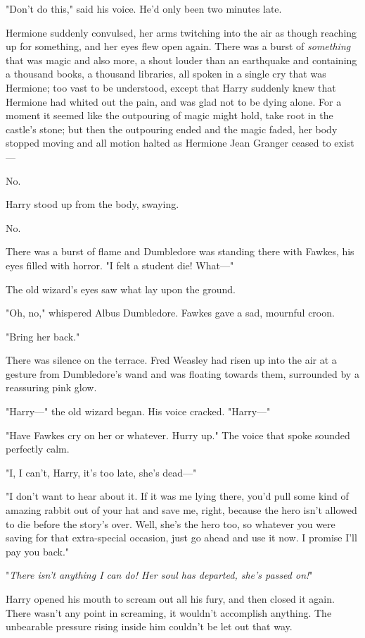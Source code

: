 "Don't do this," said his voice. He'd only been two minutes late.

Hermione suddenly convulsed, her arms twitching into the air as though reaching
up for something, and her eyes flew open again. There was a burst of
\emph{something} that was magic and also more, a shout louder than an
earthquake and containing a thousand books, a thousand libraries, all spoken in
a single cry that was Hermione; too vast to be understood, except that Harry
suddenly knew that Hermione had whited out the pain, and was glad not to be
dying alone. For a moment it seemed like the outpouring of magic might hold,
take root in the castle's stone; but then the outpouring ended and the magic
faded, her body stopped moving and all motion halted as Hermione Jean Granger
ceased to exist---

No.

Harry stood up from the body, swaying.

No.

There was a burst of flame and Dumbledore was standing there with Fawkes, his
eyes filled with horror. "I felt a student die! What\mbox{---}"

The old wizard's eyes saw what lay upon the ground.

"Oh, no," whispered Albus Dumbledore. Fawkes gave a sad, mournful croon.

"Bring her back."

There was silence on the terrace. Fred Weasley had risen up into the air at a
gesture from Dumbledore's wand and was floating towards them, surrounded by a
reassuring pink glow.

"Harry\mbox{---}" the old wizard began. His voice cracked. "Harry\mbox{---}"

"Have Fawkes cry on her or whatever. Hurry up." The voice that spoke sounded
perfectly calm.

"I, I can't, Harry, it's too late, she's dead\mbox{---}"

"I don't want to hear about it. If it was me lying there, you'd pull some kind
of amazing rabbit out of your hat and save me, right, because the hero isn't
allowed to die before the story's over. Well, she's the hero too, so whatever
you were saving for that extra-special occasion, just go ahead and use it now.
I promise I'll pay you back."

"\emph{There isn't anything I can do! Her soul has departed, she's passed on!}"

Harry opened his mouth to scream out all his fury, and then closed it again.
There wasn't any point in screaming, it wouldn't accomplish anything. The
unbearable pressure rising inside him couldn't be let out that way.

